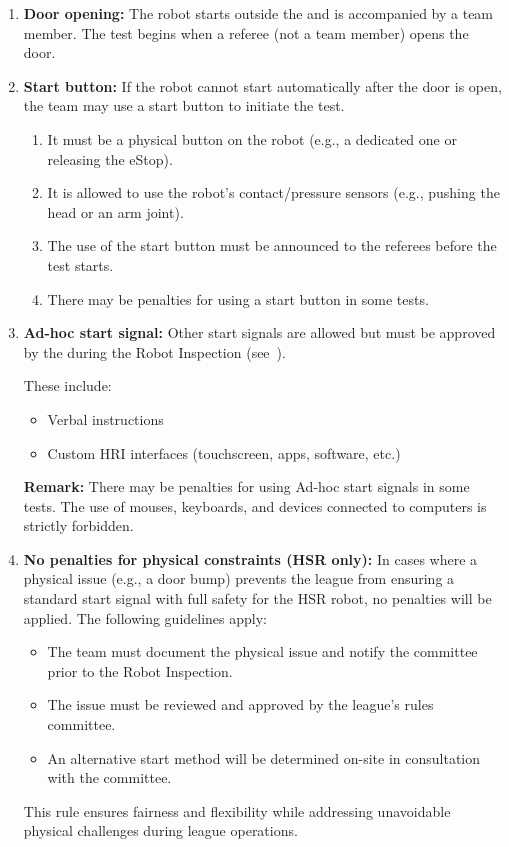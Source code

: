 \begin{enumerate}
    \item \textbf{Door opening:} The robot starts outside the \Arena{} and is accompanied by a team member. The test begins when a referee (not a team member) opens the door.

    \item \textbf{Start button:} If the robot cannot start automatically after the door is open, the team may use a start button to initiate the test.
    \begin{enumerate}[nosep]
        \item It must be a physical button on the robot (e.g., a dedicated one or releasing the eStop).
        \item It is allowed to use the robot's contact/pressure sensors (e.g., pushing the head or an arm joint).
        \item The use of the start button must be announced to the referees before the test starts.
        \item There may be penalties for using a start button in some tests.
    \end{enumerate}

    \item \textbf{Ad-hoc start signal:} Other start signals are allowed but must be approved by the \TC{} during the Robot Inspection (see~).

    These include:
    \begin{itemize}[nosep]
        \item Verbal instructions
        \item Custom HRI interfaces (touchscreen, apps, software, etc.)
    \end{itemize}
    \textbf{Remark:} There may be penalties for using Ad-hoc start signals in some tests. The use of mouses, keyboards, and devices connected to \ECRA{} computers is strictly forbidden.

    \item \textbf{No penalties for physical constraints (HSR only):} 
    In cases where a physical issue (e.g., a door bump) prevents the league from ensuring a standard start signal with full safety for the HSR robot, no penalties will be applied. The following guidelines apply:
    \begin{itemize}[nosep]
        \item The team must document the physical issue and notify the committee prior to the Robot Inspection.
        \item The issue must be reviewed and approved by the league's rules committee.
        \item An alternative start method will be determined on-site in consultation with the committee.
    \end{itemize}
    This rule ensures fairness and flexibility while addressing unavoidable physical challenges during league operations.
\end{enumerate}

